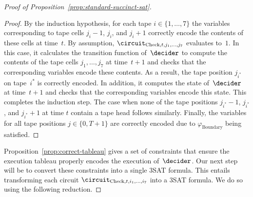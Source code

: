 \begin{proof}[Proof of Proposition~\ref{prop:standard-succinct-sat}]
\begin{proof}
  By the induction hypothesis, for each tape $i \in \{1, \ldots, 7\}$ the
  variables corresponding to tape cells $j_i-1$, $j_i$, and $j_i+1$ correctly
  encode the contents of these cells at time~$t$.
  By assumption, $\circuit_{\mathrm{Check}, t, j_1, \ldots, j_7}$ evaluates
  to~$1$.
  In this case, it calculates the transition function of~$\decider$ to compute
  the contents of the tape cells $j_1, \ldots, j_7$ at time~$t+1$ and checks
  that the corresponding variables encode these contents.
  As a result, the tape position $j_{i^*}$ on tape~$i^*$ is correctly encoded.
  In addition, it computes the state of~$\decider$ at time~$t+1$ and checks that
  the corresponding variables encode this state.
  This completes the induction step.
  The case when none of the tape positions $j_{i^*}-1$, $j_{i^*}$, and
  $j_{i^*}+1$ at time $t$ contain a tape head follows similarly.
  Finally, the variables for all tape positions $j \in \{0, T+1\}$ are correctly
  encoded due to $\varphi_{\mathrm{Boundary}}$ being satisfied.
\end{proof}
  
Proposition~\ref{prop:correct-tableau} gives a set of constraints that ensure
the execution tableau properly encodes the execution of~$\decider$.
Our next step will be to convert these constraints into a single 3SAT formula.
This entails transforming each circuit $\circuit_{\mathrm{Check}, t, i_1,
  \ldots, i_7}$ into a 3SAT formula.
We do so using the following reduction.


\end{proof}

